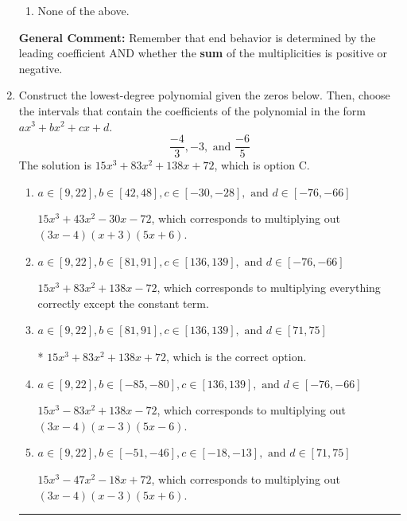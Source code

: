 \documentclass{extbook}[14pt]
\newcommand{\litem}[1]{\item #1

\rule{\textwidth}{0.4pt}}
\begin{document}
\begin{enumerate}
{\begin{enumerate}[label=\Alph*.]
\begin{multicols}{2}
\end{multicols}\item None of the above.\end{enumerate}
\textbf{General Comment:} Remember that end behavior is determined by the leading coefficient AND whether the \textbf{sum} of the multiplicities is positive or negative.
}
\litem{
Construct the lowest-degree polynomial given the zeros below. Then, choose the intervals that contain the coefficients of the polynomial in the form $ax^3+bx^2+cx+d$.
\[ \frac{-4}{3}, -3, \text{ and } \frac{-6}{5} \]The solution is \( 15x^{3} +83 x^{2} +138 x + 72 \), which is option C.\begin{enumerate}[label=\Alph*.]
\item \( a \in [9, 22], b \in [42, 48], c \in [-30, -28], \text{ and } d \in [-76, -66] \)

$15x^{3} +43 x^{2} -30 x -72$, which corresponds to multiplying out $(3x -4)(x + 3)(5x + 6)$.
\item \( a \in [9, 22], b \in [81, 91], c \in [136, 139], \text{ and } d \in [-76, -66] \)

$15x^{3} +83 x^{2} +138 x -72$, which corresponds to multiplying everything correctly except the constant term.
\item \( a \in [9, 22], b \in [81, 91], c \in [136, 139], \text{ and } d \in [71, 75] \)

* $15x^{3} +83 x^{2} +138 x + 72$, which is the correct option.
\item \( a \in [9, 22], b \in [-85, -80], c \in [136, 139], \text{ and } d \in [-76, -66] \)

$15x^{3} -83 x^{2} +138 x -72$, which corresponds to multiplying out $(3x -4)(x -3)(5x -6)$.
\item \( a \in [9, 22], b \in [-51, -46], c \in [-18, -13], \text{ and } d \in [71, 75] \)

$15x^{3} -47 x^{2} -18 x + 72$, which corresponds to multiplying out $(3x -4)(x -3)(5x + 6)$.
\end{enumerate}

}
\end{enumerate}
\end{document}
